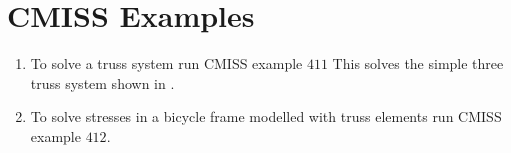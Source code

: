 \clearpage 
\section{CMISS Examples}

\begin{enumerate}
\item   To solve a truss system run CMISS example $411$
  This solves the simple three truss system shown in
  . 
  \label{xmp:Solving}

\item  To solve stresses in a bicycle frame modelled with truss elements 
  run CMISS example $412$.
  \begin{figure}[htbp] \centering
    
  \end{figure}
  \label{xmp:stressesinabike}
\end{enumerate}


%    

  


%    



